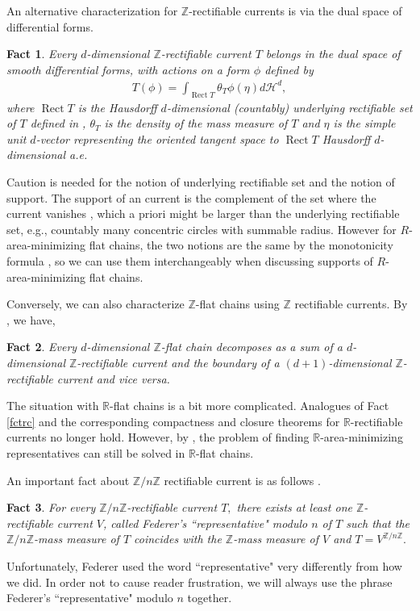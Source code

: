 \documentclass[11pt,a4paper]{amsart}
\numberwithin{equation}{section}
\newcommand{\ta}{\theta}
\newcommand{\R}{\mathbb{R}}
\newcommand{\Z}{\mathbb{Z}}
\theoremstyle{plain}
\newtheorem{fact}{Fact}[subsection]
\theoremstyle{definition}
\numberwithin{equation}{subsection}
\begin{document}
	An alternative characterization for $\Z$-rectifiable currents \cite[Section 27]{LS} is via the dual space of differential forms. \newcommand{\rct}{\operatorname{Rect}}
	\begin{fact}\label{fctcf}
		Every $d$-dimensional $\Z$-rectifiable current $T$ 	belongs in the dual space of smooth differential forms, with actions on a form $\phi$ defined by
		\begin{align*}
			T(\phi)=\int_{\rct T}\ta_T\phi(\eta)d\mathcal{H}^d,
		\end{align*}where $\rct T$ is the Hausdorff $d$-dimensional (countably) underlying rectifiable set of $T$ defined in \cite[Section 4.1.28(4)]{HF}, $\ta_T$ is the density of the mass measure of $T$ and $\eta$ is the simple unit $d$-vector representing the oriented tangent space to $\rct T$ Hausdorff $d$-dimensional a.e.~
	\end{fact}	Caution is needed for the notion of underlying rectifiable set and the notion of support. The support of an current is the complement of the set where the current vanishes \cite[Section 4.1.1]{HF}, which a priori might be larger than the underlying rectifiable set, e.g., countably many concentric circles with summable radius. However for $R$-area-minimizing flat chains, the two notions are the same by the monotonicity formula \cite[5.4.3 Theorem]{HF}, so we can use them interchangeably when discussing supports of $R$-area-minimizing flat chains. 
	
	
	Conversely, we can also characterize $\Z$-flat chains using $\Z$ rectifiable currents. By \cite[bottom of p.382 Section 4.1.24]{HF}, we have,
	\begin{fact}\label{fctfcr}
		Every	$d$-dimensional $\Z$-flat chain decomposes as a sum of a $d$-dimensional $\Z$-rectifiable current and the boundary of a $(d+1)$-dimensional $\Z$-rectifiable current and vice versa. 
	\end{fact}
	
	The situation with $\R$-flat chains is a bit more complicated. Analogues of Fact \ref{fctrc} and the corresponding compactness and closure theorems for $\R$-rectifiable currents no longer hold. However, by \cite{HFrf}, the problem of finding $\R$-area-minimizing representatives can still be solved in $\R$-flat chains.
	
	An important fact about $\Z/n\Z$ rectifiable current is as follows \cite[p.430 of Section 4.2.26]{HF}. 
	\begin{fact}\label{fctrmn}
		For every $\Z/n\Z$-rectifiable current $T,$ there exists at least one $\Z$-rectifiable current $V$, called Federer's ``representative" modulo $n$ of $T$ such that the $\Z/n\Z$-mass measure of $T$ coincides with the $\Z$-mass measure of $V$ and $T=V^{\Z/n\Z}.$
	\end{fact}
	Unfortunately, Federer used the word ``representative" very differently from how we did. In order not to cause reader frustration, we will always use the phrase Federer's ``representative" modulo $n$ together.
	
\end{document}
